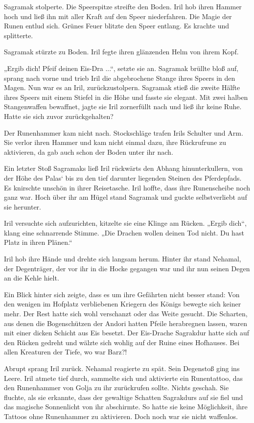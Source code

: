 Sagramak stolperte. Die Speerspitze streifte den Boden. Iril hob ihren Hammer hoch und ließ ihn mit aller Kraft auf den Speer niederfahren. Die Magie der Runen entlud sich. Grünes Feuer blitzte den Speer entlang. Es krachte und splitterte.

Sagramak stürzte zu Boden. Iril fegte ihren glänzenden Helm von ihrem Kopf.

„Ergib dich! Pfeif deinen Eis-Dra ...“, setzte sie an. Sagramak brüllte bloß auf, sprang nach vorne und trieb Iril die abgebrochene Stange ihres Speers in den Magen. Nun war es an Iril, zurückzustolpern. Sagramak stieß die zweite Hälfte ihres Speers mit einem Stiefel in die Höhe und fasste sie elegant. Mit zwei halben Stangenwaffen bewaffnet, jagte sie Iril zornerfüllt nach und ließ ihr keine Ruhe. Hatte sie sich zuvor zurückgehalten?

Der Runenhammer kam nicht nach. Stockschläge trafen Irils Schulter und Arm. Sie verlor ihren Hammer und kam nicht einmal dazu, ihre Rückrufrune zu aktivieren, da gab auch schon der Boden unter ihr nach.

Ein letzter Stoß Sagramaks ließ Iril rückwärts den Abhang hinunterkullern, von der Höhe des Palas‘ bis zu den tief darunter liegenden Steinen des Pferdepfads. Es knirschte unschön in ihrer Reisetasche. Iril hoffte, dass ihre Runenscheibe noch ganz war. Hoch über ihr am Hügel stand Sagramak und guckte selbstverliebt auf sie herunter.

Iril versuchte sich aufzurichten, kitzelte sie eine Klinge am Rücken. „Ergib dich“, klang eine schnarrende Stimme. „Die Drachen wollen deinen Tod nicht. Du hast Platz in ihren Plänen.“

Iril hob ihre Hände und drehte sich langsam herum. Hinter ihr stand Nehamal, der Degenträger, der vor ihr in die Hocke gegangen war und ihr nun seinen Degen an die Kehle hielt.

Ein Blick hinter sich zeigte, dass es um ihre Gefährten nicht besser stand: Von den wenigen im Hofplatz verbliebenen Kriegern des Königs bewegte sich keiner mehr. Der Rest hatte sich wohl verschanzt oder das Weite gesucht. Die Scharten, aus denen die Bogenschützen der Andori hatten Pfeile herabregnen lassen, waren mit einer dicken Schicht aus Eis besetzt. Der Eis-Drache Sagrakdur hatte sich auf den Rücken gedreht und wälzte sich wohlig auf der Ruine eines Hofhauses. Bei allen Kreaturen der Tiefe, wo war Barz?!

Abrupt sprang Iril zurück. Nehamal reagierte zu spät. Sein Degenstoß ging ins Leere. Iril atmete tief durch, sammelte sich und aktivierte ein Runentattoo, das den Runenhammer von Golja zu ihr zurückrufen sollte. Nichts geschah. Sie fluchte, als sie erkannte, dass der gewaltige Schatten Sagrakdurs auf sie fiel und das magische Sonnenlicht von ihr abschirmte. So hatte sie keine Möglichkeit, ihre Tattoos ohne Runenhammer zu aktivieren. Doch noch war sie nicht waffenlos.

